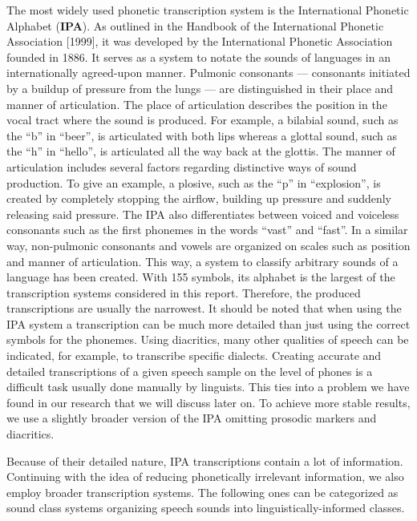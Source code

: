 The most widely used phonetic transcription system is the International Phonetic Alphabet (\textbf{IPA}).
As outlined in the Handbook of the International Phonetic Association [1999], it was developed by the International Phonetic Association founded in 1886.
It serves as a system to notate the sounds of languages in an internationally agreed-upon manner.
Pulmonic consonants --- consonants initiated by a buildup of pressure from the lungs --- are distinguished in their place and manner of articulation.
The place of articulation describes the position in the vocal tract where the sound is produced.
For example, a bilabial sound, such as the ``b'' in ``beer'', is articulated with both lips whereas a glottal sound, such as the ``h'' in ``hello'', is articulated all the way back at the glottis.  %
The manner of articulation includes several factors regarding distinctive ways of sound production.
To give an example, a plosive, such as the ``p'' in ``explosion'', is created by completely stopping the airflow, building up pressure and suddenly releasing said pressure.
The IPA also differentiates between voiced and voiceless consonants such as the first phonemes in the words ``vast'' and ``fast''.
In a similar way, non-pulmonic consonants and vowels are organized on scales such as position and manner of articulation.
This way, a system to classify arbitrary sounds of a language has been created.
With 155 symbols, its alphabet is the largest of the transcription systems considered in this report.
Therefore, the produced transcriptions are usually the narrowest.
It should be noted that when using the IPA system a transcription can be much more detailed than just using the correct symbols for the phonemes.
Using diacritics, many other qualities of speech can be indicated, for example, to transcribe specific dialects.
Creating accurate and detailed transcriptions of a given speech sample on the level of phones is a difficult task usually done manually by linguists.
This ties into a problem we have found in our research that we will discuss later on.
To achieve more stable results, we use a slightly broader version of the IPA omitting prosodic markers and diacritics.
\newline

Because of their detailed nature, IPA transcriptions contain a lot of information.
Continuing with the idea of reducing phonetically irrelevant information, we also employ broader transcription systems.
The following ones can be categorized as sound class systems organizing speech sounds into linguistically-informed classes.

